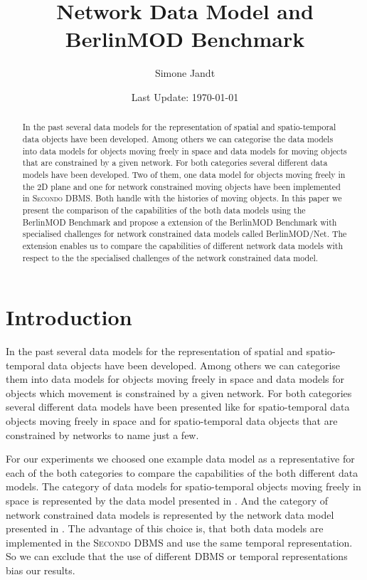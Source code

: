 \documentclass[a4paper]{article}
\title{Network Data Model and BerlinMOD Benchmark}
\author{Simone Jandt}
\date{Last Update: \today}
\newcommand{\secondo}{\textsc{Secondo}}
\newcommand{\bmodb} {BerlinMOD Benchmark}
\begin{document}
\maketitle
\begin{abstract}
In the past several data models for the representation of spatial and
spatio-temporal data objects have been developed. Among others we can categorise
the data models into data models for objects moving freely in space and data
models for moving objects that are constrained by a given network. For both
categories several different data models have been developed. Two of them, one
data model for objects moving freely in the 2D plane and one for network
constrained moving objects have been implemented in \secondo{} DBMS. Both
handle with the histories of moving objects. In this paper we present the
comparison of the capabilities of the both data models using the \bmodb{} and
propose a extension of the \bmodb{} with specialised challenges for network
constrained data models called BerlinMOD/Net. The extension enables us to
compare the capabilities of different network data models with respect to the
the specialised challenges of the network constrained data model.
\end{abstract}
\section{Introduction}
In the past several data models for the representation of spatial and
spatio-temporal data objects have been developed. Among others we can categorise
them into data models for objects moving freely in space and data models for
objects which movement is constrained by a given network. For both categories
several different data models have been presented like
\cite{335426,chenzaniolosqlst} for spatio-temporal data objects moving freely in
 space and \cite{1146465,956692,VazWolfNetMod} for spatio-temporal data objects
that are constrained by networks to name just a few.

For our experiments we choosed one example data model as a representative for
each of the both categories to compare the capabilities of the both different
data models. The category of data models for spatio-temporal objects moving
freely in space is represented by the data model presented in \cite{335426}.
And the category of network constrained data models is represented by the
network data model presented in \cite{1146465}. The advantage of this choice is,
 that both data models are implemented in the \secondo{} DBMS and use the same
 temporal representation. So we can exclude that the use of different DBMS or
temporal representations bias our results.
\end{document}
